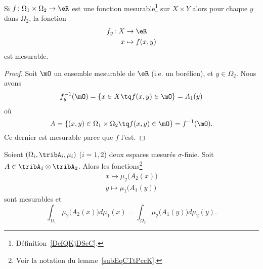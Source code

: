 \begin{corollary}
	Si \( f\colon \Omega_1\times \Omega_2\to \eR\) est une fonction mesurable\footnote{Définition~\ref{DefQKjDSeC}.} sur \( X\times Y\) alors pour chaque \( y\) dans \( \Omega_2\), la fonction
	\begin{equation}
		\begin{aligned}
			f_y\colon X & \to \eR        \\
			x           & \mapsto f(x,y)
		\end{aligned}
	\end{equation}
	est mesurable.
\end{corollary}

\begin{proof}
	Soit \( \mO\) un ensemble mesurable de \( \eR\) (i.e. un borélien), et \( y\in \Omega_2\). Nous avons
	\begin{equation}
		f_y^{-1}(\mO)=\{ x\in X\tq f(x,y)\in \mO \}=A_1(y)
	\end{equation}
	où
	\begin{equation}
		A=\{ (x,y)\in \Omega_1\times \Omega_2\tq f(x,y)\in \mO \}=f^{-1}(\mO).
	\end{equation}
	Ce dernier est mesurable parce que \( f\) l'est.
\end{proof}

\begin{theorem}    \label{ThoCCIsLhO}
	Soient \( (\Omega_i,\tribA_i,\mu_i)\) (\( i=1,2\)) deux espaces mesurés \( \sigma\)-finie. Soit \( A\in\tribA_1\otimes \tribA_2\). Alors les fonctions\footnote{Voir la notation du lemme~\ref{subEqCTtPccK}.}
	\begin{subequations}
		\begin{align}
			x\mapsto\mu_2\big( A_2(x) \big) \\
			y\mapsto\mu_1\big( A_1(y) \big)
		\end{align}
	\end{subequations}
	sont mesurables et
	\begin{equation}    \label{EqRKXwsQJ}
		\int_{\Omega_1}\mu_2\big( A_2(x) \big)d\mu_1(x)=\int_{\Omega_2}\mu_2\big( A_1(y) \big)d\mu_2(y).
	\end{equation}
\end{theorem}

